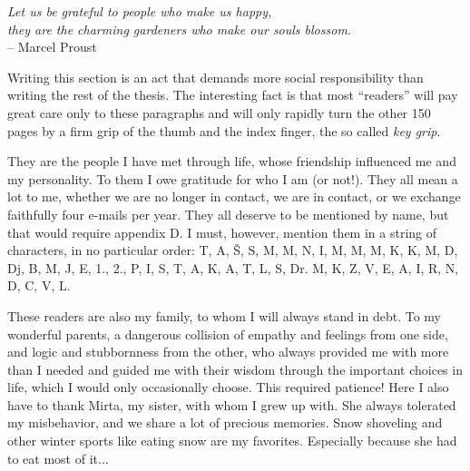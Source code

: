 \cleardoublepage

{}

\begin{acknowledgements}

\narrowlinespacing
\begin{myquote}
\begin{flushright}
\textit{Let us be grateful to people who make us happy,\\they are the charming gardeners who make our souls blossom.} \\-- Marcel Proust
\end{flushright}
\end{myquote}
\normallinespacing

Writing this section is an act that demands more social responsibility than writing the rest of the thesis. The interesting fact is that most “readers” will pay great care only to these paragraphs and will only rapidly turn the other 150 pages by a firm grip of the thumb and the index finger, the so called \emph{key grip}.

They are the people I have met through life, whose friendship influenced me and my personality. To them I owe gratitude for who I am (or not!). They all mean a lot to me, whether we are no longer in contact, we are in contact, or we exchange faithfully four e-mails per year. They all deserve to be mentioned by name, but that would require appendix D. I must, however, mention them in a string of characters, in no particular order: T, A, Š, S, M, M, N, I, M, M, M, K, K, M, D, Dj, B, M, J, E, 1., 2., P, I, S, T, A, K, A, T, L, S, Dr. M, K, Z, V, E, A, I, R, N, D, C, V, L.

These readers are also my family, to whom I will always stand in debt. To my wonderful parents, a dangerous collision of empathy and feelings from one side, and logic and stubbornness from the other, who always provided me with more than I needed and guided me with their wisdom through the important choices in life, which I would only occasionally choose. This required patience! Here I also have to thank Mirta, my sister, with whom I grew up with. She always tolerated my misbehavior, and we share a lot of precious memories. Snow shoveling and other winter sports like eating snow are my favorites. Especially because she had to eat most of it...


\end{acknowledgements}
